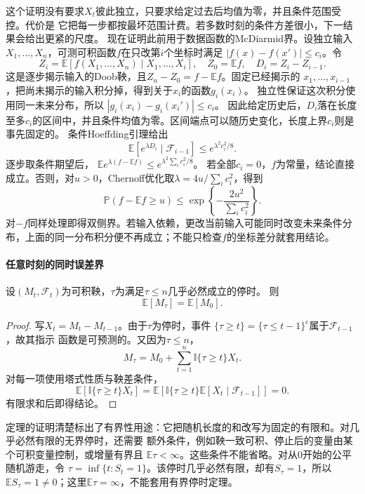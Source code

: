 这个证明没有要求$X_t$彼此独立，只要求给定过去后均值为零，并且条件范围受控。代价是
它把每一步都按最坏范围计费。若多数时刻的条件方差很小，下一结果会给出更紧的尺度。
现在证明此前用于数据函数的McDiarmid界。设独立输入
\(X_1,\ldots,X_n\)，可测可积函数\(f\)在只改第\(i\)个坐标时满足
\(|f(x)-f(x')|\leq c_i\)。令
\[
Z_i=\mathbb E[f(X_1,\ldots,X_n)\mid X_1,\ldots,X_i],
\quad Z_0=\mathbb Ef,\quad D_i=Z_i-Z_{i-1}.
\]
这是逐步揭示输入的Doob鞅，且\(Z_n-Z_0=f-\mathbb Ef\)。固定已经揭示的
\(x_1,\ldots,x_{i-1}\)，把尚未揭示的输入积分掉，得到关于\(x_i\)的函数\(g_i(x_i)\)。
独立性保证这次积分使用同一未来分布，所以
\(|g_i(x_i)-g_i(x_i')|\leq c_i\)。
因此给定历史后，\(D_i\)落在长度至多\(c_i\)的区间中，并且条件均值为零。区间端点可以随历史变化，长度上界\(c_i\)则是事先固定的。
条件Hoeffding引理给出
\[
\mathbb E[e^{\lambda D_i}\mid\mathcal F_{i-1}]
\leq e^{\lambda^2c_i^2/8}.
\]
逐步取条件期望后，
\(\mathbb E e^{\lambda(f-\mathbb Ef)}
\leq e^{\lambda^2\sum_i c_i^2/8}\)。
若全部\(c_i=0\)，\(f\)为常量，结论直接成立。否则，对\(u>0\)，Chernoff优化取\(\lambda=4u/\sum_i c_i^2\)，得到
\[
\mathbb P(f-\mathbb Ef\geq u)
\leq\exp\left\{-\frac{2u^2}{\sum_i c_i^2}\right\}.
\]
对\(-f\)同样处理即得双侧界。若输入依赖，更改当前输入可能同时改变未来条件分布，上面的同一分布积分便不再成立；不能只检查\(f\)的坐标差分就套用结论。

\paragraph{任意时刻的同时误差界}
\label{sec:rv-anytime}
\label{sec:stoch-self-normalized-adaptive-design}
\begin{theorem}[有界停时的可选停止]
  \label{thm:stoch-bounded-optional-stopping}
  设$(M_t,\mathcal{F}_t)$为可积鞅，$\tau$为满足$\tau\leq n$几乎必然成立的停时。
  则
  \[
    \mathbb{E}[M_\tau]=\mathbb{E}[M_0].
  \]
\end{theorem}

\begin{proof}
写$X_t=M_t-M_{t-1}$。由于$\tau$为停时，事件
$\{\tau\geq t\}=\{\tau\leq t-1\}^{\mathrm{c}}$属于$\mathcal{F}_{t-1}$，故其指示
函数是可预测的。又因为$\tau\leq n$，
\[
  M_\tau
  =
  M_0+\sum_{t=1}^{n}\mathbb{I}\{\tau\geq t\}X_t.
\]
对每一项使用塔式性质与鞅差条件，
\[
  \mathbb{E}\!\left[
    \mathbb{I}\{\tau\geq t\}X_t
  \right]
  =
  \mathbb{E}\!\left[
    \mathbb{I}\{\tau\geq t\}
    \mathbb{E}[X_t\mid\mathcal{F}_{t-1}]
  \right]
  =0.
\]
有限求和后即得结论。
\end{proof}

定理的证明清楚标出了有界性用途：它把随机长度的和改写为固定的有限和。对几乎必然有限的无界停时，还需要
额外条件，例如鞅一致可积、停止后的变量由某个可积变量控制，或增量有界且
$\mathbb{E}\tau<\infty$。这些条件不能省略。对从$0$开始的公平随机游走，令
$\tau=\inf\{t:S_t=1\}$。该停时几乎必然有限，却有$S_\tau=1$，所以
$\mathbb{E}S_\tau=1\neq0$；这里$\mathbb{E}\tau=\infty$，不能套用有界停时定理。

